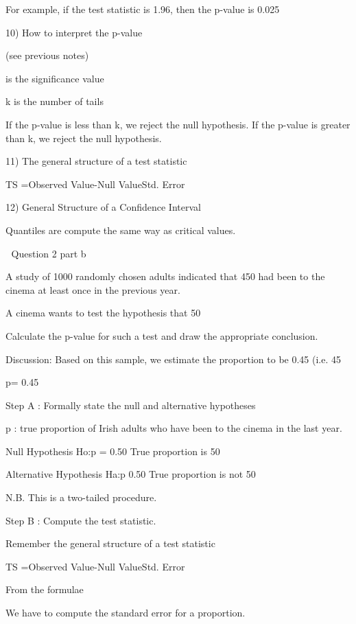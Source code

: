 For example, if the test statistic is 1.96, then the p-value is 0.025
 
10) How to interpret the p-value
 
    (see previous notes)
 
 is the significance value
 
k is the number of tails

If the p-value is less than k, we reject the null hypothesis.
If the p-value is greater than k, we reject the null hypothesis.
 
11) The general structure of a test statistic
 
TS =Observed Value-Null ValueStd. Error 
 
12) General Structure of a Confidence Interval

 

 
Quantiles are compute the same way as critical values.
 
 
Question 2 part b
 
A study of 1000 randomly chosen adults indicated that 450 had been to the cinema at least once in the previous year.
 
A cinema wants to test the hypothesis that 50%
 
Calculate the p-value for such a test and draw the appropriate conclusion.
 
Discussion: Based on this sample, we estimate the proportion to be 0.45  (i.e. 45%
 
p= 0.45
 
Step A : Formally state the null and alternative hypotheses
 
p : true proportion of Irish adults who have been to the cinema in the last year.
 
Null Hypothesis               Ho:p = 0.50        True proportion is 50%
 
Alternative Hypothesis      Ha:p 0.50        True proportion is not 50%
 
 
N.B. This is a two-tailed procedure.
 
 
Step B : Compute the test statistic.
 
Remember the general structure of a test statistic
 
TS =Observed Value-Null ValueStd. Error 
 
 
 
From the formulae
 
We have to compute the standard error for a proportion. 
 
